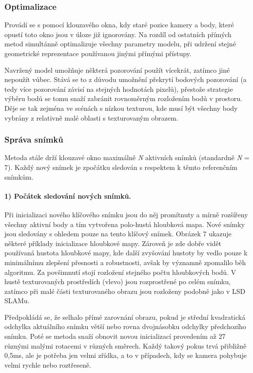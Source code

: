 \documentclass[12pt,a4paper]{article}
\begin{document}
\subsubsection*{Optimalizace} Provádí se s pomocí klouzavého okna, kdy staré pozice kamery a body, které opustí toto okno jsou v úloze již ignorovány. Na rozdíl od ostatních přímých metod simultánně optimalizuje všechny parametry modelu, při udržení stejné geometrické reprezentace používanou jinými přímými přístupy.

Navržený model umožňuje některá pozorování použít vícekrát, zatímco jiné nepoužít vůbec. Stává se to z důvodu umožnění překrytí bodových pozorování (a tedy více pozorování závisí na stejných hodnotách pixelů), přestože strategie výběru bodů se tomu snaží zabránit rovnoměrným rozložením bodů v prostoru. Děje se tak zejména ve scénách s nízkou texturou, kde musí být všechny body vybrány z relativně malé oblasti s texturovaným obrazem. 

\subsubsection*{Správa snímků}
Metoda stále drží klouzavé okno maximálně \textit{N} aktivních snímků (standardně \textit{N} = 7). Každý nový snímek je zpočátku sledován s respektem k těmto referenčním snímkům.

\paragraph*{1) Počátek sledování nových snímků.} Při inicializaci nového klíčového snímku jsou do něj promítnuty a mírně rozšířeny všechny aktivní body a tím vytvořena polo-hustá hloubková mapa. Nové snímky jsou sledovány s ohledem pouze na tento klíčový snímek. Obrázek 7 ukazuje některé příklady inicializace hloubkové mapy. Zároveň je zde dobře vidět používaná hustota hloubkové mapy, kde další zvyšování hustoty by vedlo pouze k minimálnímu zlepšení přesnosti a robustnosti, avšak by významně zpomalilo běh algoritmu. Za povšimnutí stojí rozložení stejného počtu hloubkových bodů. V hustě texturovaných prostředích (vlevo) jsou rozprostřené po celém snímku, zatímco při malé části texturovaného obrazu jsou rozloženy podobně jako v LSD SLAMu.

Předpokládá se, že selhalo přímé zarovnání obrazu, pokud je střední kvadratická odchylka aktuálního snímku větší nebo rovna dvojnásobku odchylky předchozího snímku. Poté se metoda snaží obnovit novou inicializací provedením až 27 různými malými rotacemi v různých směrech. Každý takový pokus trvá přibližně 0,5ms, ale je potřeba jen velmi zřídka, a to v případech, kdy se kamera pohybuje velmi rychle nebo roztřeseně.
\end{document}
